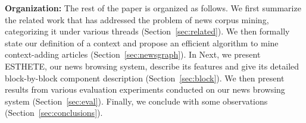\textbf{Organization:} The rest of the paper is organized as
follows. We first summarize the related work that has addressed the
problem of news corpus mining, categorizing it under various threads
(Section~\ref{sec:related}). We then formally state our definition of
a context and propose an efficient algorithm to mine context-adding articles (Section~\ref{sec:newsgraph}).  In
Next, we present ESTHETE, our news browsing system, describe its features and give its detailed block-by-block component description
(Section~\ref{sec:block}). We then present results from various
evaluation experiments conducted on our news browsing system
(Section~\ref{sec:eval}). Finally, we conclude with some
observations (Section~\ref{sec:conclusions}).
